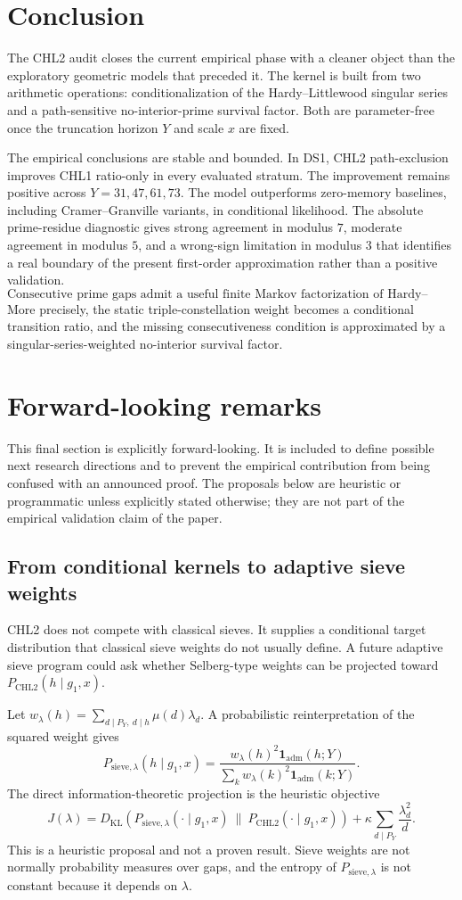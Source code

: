 \documentclass[10pt]{article}
\newcommand{\CHLtwo}{\mathrm{CHL2}}
\newcommand{\oneadm}{\mathbf{1}_{\mathrm{adm}}}
\begin{document}
\section{Conclusion}
The CHL2 audit closes the current empirical phase with a cleaner object than the exploratory geometric models that preceded it. The kernel is built from two arithmetic operations: conditionalization of the Hardy--Littlewood singular series and a path-sensitive no-interior-prime survival factor. Both are parameter-free once the truncation horizon $Y$ and scale $x$ are fixed.

The empirical conclusions are stable and bounded. In DS1, CHL2 path-exclusion improves CHL1 ratio-only in every evaluated stratum. The improvement remains positive across $Y=31,47,61,73$. The model outperforms zero-memory baselines, including Cramer--Granville variants, in conditional likelihood. The absolute prime-residue diagnostic gives strong agreement in modulus $7$, moderate agreement in modulus $5$, and a wrong-sign limitation in modulus $3$ that identifies a real boundary of the present first-order approximation rather than a positive validation.
\[
\boxed{\text{Consecutive prime gaps admit a useful finite Markov factorization of Hardy--Littlewood structure.}}
\]
More precisely, the static triple-constellation weight becomes a conditional transition ratio, and the missing consecutiveness condition is approximated by a singular-series-weighted no-interior survival factor.
\section{Forward-looking remarks}
This final section is explicitly forward-looking. It is included to define possible next research directions and to prevent the empirical contribution from being confused with an announced proof. The proposals below are heuristic or programmatic unless explicitly stated otherwise; they are not part of the empirical validation claim of the paper.
\subsection{From conditional kernels to adaptive sieve weights}
CHL2 does not compete with classical sieves. It supplies a conditional target distribution that classical sieve weights do not usually define. A future adaptive sieve program could ask whether Selberg-type weights can be projected toward $P_{\CHLtwo}(h\mid g_1,x)$.

Let $w_\lambda(h)=\sum_{d\mid P_Y,\ d\mid h}\mu(d)\lambda_d$. A probabilistic reinterpretation of the squared weight gives
\[
P_{\mathrm{sieve},\lambda}(h\mid g_1,x)=\frac{w_\lambda(h)^2\oneadm(h;Y)}{\sum_k w_\lambda(k)^2\oneadm(k;Y)}.
\]
The direct information-theoretic projection is the heuristic objective
\[
J(\lambda)=D_{\mathrm{KL}}\!\left(P_{\mathrm{sieve},\lambda}(\cdot\mid g_1,x)\ \|\ P_{\CHLtwo}(\cdot\mid g_1,x)\right)+\kappa\sum_{d\mid P_Y}\frac{\lambda_d^2}{d}.
\]
This is a heuristic proposal and not a proven result. Sieve weights are not normally probability measures over gaps, and the entropy of $P_{\mathrm{sieve},\lambda}$ is not constant because it depends on $\lambda$.
\end{document}
